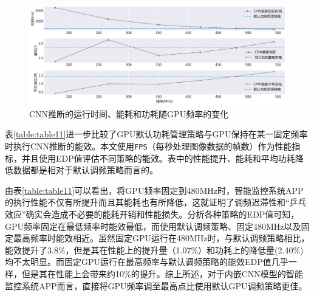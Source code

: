 \begin{figure}[htbp]
    \centering
    \includegraphics[width=1.0\textwidth]{figures/system_explore.pdf}
    \caption{CNN推断的运行时间、能耗和功耗随GPU频率的变化}\label{figure:figure38}
\end{figure}

表\ref{table:table11}进一步比较了GPU默认功耗管理策略与GPU保持在某一固定频率时执行CNN推断的能效。本文使用\texttt{FPS}（每秒处理图像数据的帧数）作为性能指标，并且使用EDP值评估不同策略的能效。表中的性能提升、能耗和平均功耗降低数据都是相对于默认调频策略而言的。

\begin{table}[htbp]
  \centering
  \caption{智能监控系统APP在不同调频策略下的能效}
  \label{table:table11}
\end{table}

由表\ref{table:table11}可以看出，将GPU频率固定到480MHz时，智能监控系统APP的执行性能不仅有所提升而且其能耗也有所降低，这就证明了调频迟滞性和“乒乓效应”确实会造成不必要的能耗开销和性能损失。分析各种策略的EDP值可知，GPU频率固定在最低频率时能效最低，而使用默认调频策略、固定480MHz以及固定最高频率时能效相近。虽然固定GPU运行在480MHz时，与默认调频策略相比，能效提升了3.8\%，但是其在性能上的提升量（1.07\%）和功耗上的降低量(2.40\%)均不太明显。而固定GPU运行在最高频率与默认调频策略的能效EDP值几乎一样，但是其在性能上会带来约10\%的提升。综上所述，对于内嵌CNN模型的智能监控系统APP而言，直接将GPU频率调至最高点比使用默认GPU调频策略更佳。

